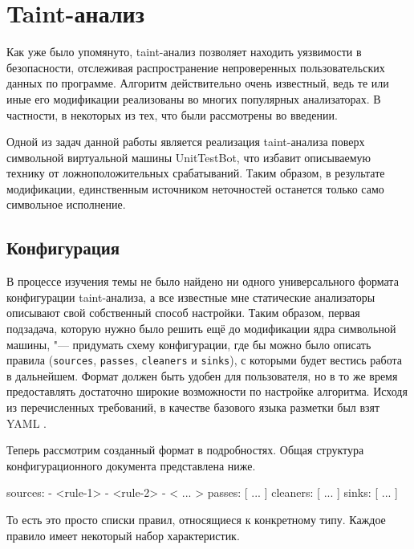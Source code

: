 \section{Taint-анализ}

Как уже было упомянуто, taint-анализ позволяет находить уязвимости в безопасности, отслеживая распространение непроверенных пользовательских данных по программе. Алгоритм действительно очень известный, ведь те или иные его модификации реализованы во многих популярных анализаторах. В частности, в некоторых из тех, что были рассмотрены во введении.

Одной из задач данной работы является реализация taint-анализа поверх символьной виртуальной машины UnitTestBot, что избавит описываемую технику от ложноположительных срабатываний. Таким образом, в результате модификации, единственным источником неточностей останется только само символьное исполнение.

\subsection{Конфигурация}

В процессе изучения темы не было найдено ни одного универсального формата конфигурации taint-анализа, а все известные мне статические анализаторы описывают свой собственный способ настройки. Таким образом, первая подзадача, которую нужно было решить ещё до модификации ядра символьной машины, "--- придумать схему конфигурации, где бы можно было описать правила (\verb|sources|, \verb|passes|, \verb|cleaners| и \verb|sinks|), с которыми будет вестись работа в дальнейшем. Формат должен быть удобен для пользователя, но в то же время предоставлять достаточно широкие возможности по настройке алгоритма. Исходя из перечисленных требований, в качестве базового языка разметки был взят YAML \cite{yaml}.

Теперь рассмотрим созданный формат в подробностях. Общая структура конфигурационного документа представлена ниже.

\begin{nocode}
sources:
  - <rule-1>
  - <rule-2>
  - < ... >
passes: [ ... ]
cleaners: [ ... ]
sinks: [ ... ]
\end{nocode}

То есть это просто списки правил, относящиеся к конкретному типу. Каждое правило имеет некоторый набор характеристик.

